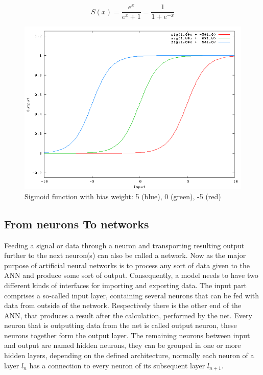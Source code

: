 \begin{equation}
\label{eqn:sigmoid}
S(x) = \frac{e^x}{e^x + 1} = \frac{1}{1 + e^{-x}}
\end{equation} 


\begin{figure}[H]
	\centering
	\includegraphics[width=\textwidth]{images/sigmoid.png}
	\caption{Sigmoid function with bias weight: 5 (blue), 0 (green), -5 (red)\protect\footnotemark}
	\label{fig:sigmoid}
\end{figure}


\subsection{From neurons To networks}
Feeding a signal or data through a neuron and transporting resulting output further to the next neuron(s) can also be called a network. Now as the major purpose of artificial neural networks is to process any sort of data given to the ANN and produce some sort of output. Consequently, a model needs to have two different kinds of interfaces for importing and exporting data. \newline
The input part comprises a so-called input layer, containing several neurons that can be fed with data from outside of the network. Respectively there is the other end of the ANN, that produces a result after the calculation, performed by the net. Every neuron that is outputting data from the net is called output neuron, these neurons together form the output layer. The remaining neurons between input and output are named hidden neurons, they can be grouped in one or more hidden layers, depending on the defined architecture, normally each neuron of a layer $l_{n}$ has a connection to every neuron of its subsequent layer $l_{n+1}$.

